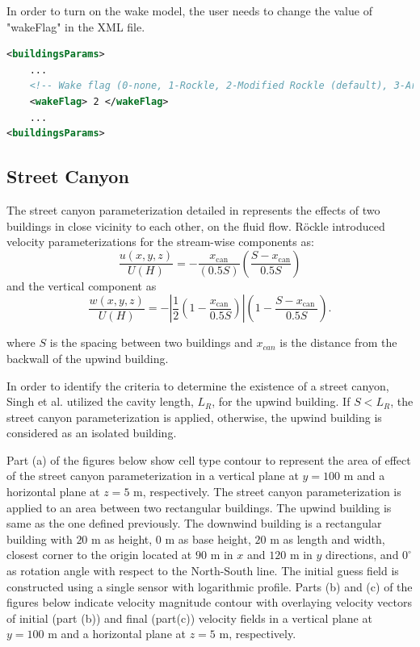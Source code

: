 In order to turn on the wake model, the user needs to change the value of "wakeFlag" in the XML file.

\begin{lstlisting}[language=XML]
<buildingsParams>
	...
	<!-- Wake flag (0-none, 1-Rockle, 2-Modified Rockle (default), 3-Area Scaled) -->
	<wakeFlag> 2 </wakeFlag>
	...
<buildingsParams>
\end{lstlisting}

\subsection{Street Canyon}

The street canyon parameterization detailed in \cite{singh2008evaluation} represents the effects of two buildings in close vicinity to each other, on the fluid flow. R\"{o}ckle \cite{rockle1990bestimmung} introduced velocity parameterizations for the stream-wise components as:
\begin{equation}
\frac{u(x, y, z)}{U(H)}=-\frac{x_{\mathrm{can}}}{(0.5 S)}\left(\frac{S-x_{\mathrm{can}}}{0.5 S}\right)
\label{eq:u_can}
\end{equation}
and the vertical component as
\begin{equation}
\frac{w(x, y, z)}{U(H)}=-\left|\frac{1}{2}\left(1-\frac{x_{\text {can }}}{0.5 S}\right)\right|\left(1-\frac{S-x_{\text {can }}}{0.5 S}\right).
\label{eq:w_can}
\end{equation}

where $S$ is the spacing between two buildings and $x_{can}$ is the distance from the backwall of the upwind building.

In order to identify the criteria to determine the existence of a street canyon, Singh et al. \cite{singh2008evaluation} utilized the cavity length, $L_R$, for the upwind building. If $S < L_R$, the street canyon parameterization is applied, otherwise, the upwind building is considered as an isolated building.

Part (a) of the figures below show cell type contour to represent the area of effect of the street canyon parameterization in a vertical plane at $y=100$ m and a horizontal plane at $z=5$ m, respectively. The street canyon parameterization is applied to an area between two rectangular buildings. The upwind building is same as the one defined previously. The downwind building is a rectangular building with $20$ m as height, $0$ m as base height, $20$ m as length and width, closest corner to the origin located at $90$ m in $x$ and $120$ m in $y$ directions, and $0^{\circ}$ as rotation angle with respect to the North-South line. The initial guess field is constructed using a single sensor with logarithmic profile. Parts (b) and (c) of the figures below indicate velocity magnitude contour with overlaying velocity vectors of initial (part (b)) and final (part(c)) velocity fields in a vertical plane at $y=100$ m and a horizontal plane at $z=5$ m, respectively.

